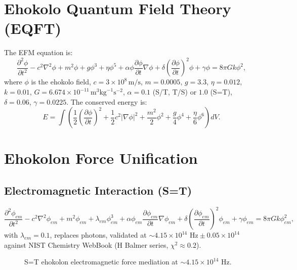 \documentclass{article}
\begin{document}
\section{Ehokolo Quantum Field Theory (EQFT)}
The EFM equation is:
\begin{equation}
\frac{\partial^2 \phi}{\partial t^2} - c^2 \nabla^2 \phi + m^2 \phi + g \phi^3 + \eta \phi^5 + \alpha \phi \frac{\partial \phi}{\partial t} \nabla \phi + \delta \left( \frac{\partial \phi}{\partial t} \right)^2 \phi + \gamma \phi = 8 \pi G k \phi^2,
\end{equation}
where \(\phi\) is the ehokolo field, \(c = 3 \times 10^8 \, \text{m/s}\), \(m = 0.0005\), \(g = 3.3\), \(\eta = 0.012\), \(k = 0.01\), \(G = 6.674 \times 10^{-11} \, \text{m}^3 \text{kg}^{-1} \text{s}^{-2}\), \(\alpha = 0.1\) (S/T, T/S) or \(1.0\) (S=T), \(\delta = 0.06\), \(\gamma = 0.0225\). The conserved energy is:
\begin{equation}
E = \int \left( \frac{1}{2} \left(\frac{\partial \phi}{\partial t}\right)^2 + \frac{1}{2} c^2 |\nabla \phi|^2 + \frac{m^2}{2} \phi^2 + \frac{g}{4} \phi^4 + \frac{\eta}{6} \phi^6 \right) dV.
\end{equation}

\section{Ehokolon Force Unification}
\subsection{Electromagnetic Interaction (S=T)}
\begin{equation}
\frac{\partial^2 \phi_{em}}{\partial t^2} - c^2 \nabla^2 \phi_{em} + m^2 \phi_{em} + \lambda_{em} \phi_{em}^3 + \alpha \phi_{em} \frac{\partial \phi_{em}}{\partial t} \nabla \phi_{em} + \delta \left( \frac{\partial \phi_{em}}{\partial t} \right)^2 \phi_{em} + \gamma \phi_{em} = 8 \pi G k \phi_{em}^2,
\end{equation}
with \(\lambda_{em} = 0.1\), replaces photons, validated at \(\sim 4.15 \times 10^{14} \text{ Hz} \pm 0.05 \times 10^{14}\) against NIST Chemistry WebBook (H Balmer series, \(\chi^2 \approx 0.2\)).

\begin{figure}[htbp]
    \centering
    \caption{S=T ehokolon electromagnetic force mediation at \(\sim 4.15 \times 10^{14} \text{ Hz}\).}
    \label{fig:force}
\end{figure}
\end{document}

